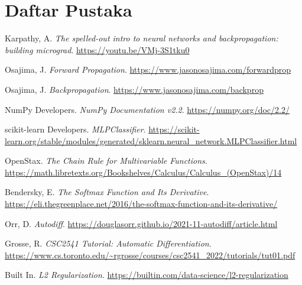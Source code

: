 
\chapter*{Daftar Pustaka}

\begin{enumerate}[label={[\arabic*]}]
    \item Karpathy, A. \textit{The spelled-out intro to neural networks and backpropagation: building micrograd}. \url{https://youtu.be/VMj-3S1tku0}

    \item Osajima, J. \textit{Forward Propagation}. \url{https://www.jasonosajima.com/forwardprop}

    \item Osajima, J. \textit{Backpropagation}. \url{https://www.jasonosajima.com/backprop}

    \item NumPy Developers. \textit{NumPy Documentation v2.2}. \url{https://numpy.org/doc/2.2/}

    \item scikit-learn Developers. \textit{MLPClassifier}. \url{https://scikit-learn.org/stable/modules/generated/sklearn.neural_network.MLPClassifier.html}

    \item OpenStax. \textit{The Chain Rule for Multivariable Functions}. \url{https://math.libretexts.org/Bookshelves/Calculus/Calculus_(OpenStax)/14}

    \item Bendersky, E. \textit{The Softmax Function and Its Derivative}. \url{https://eli.thegreenplace.net/2016/the-softmax-function-and-its-derivative/}

    \item Orr, D. \textit{Autodiff}. \url{https://douglasorr.github.io/2021-11-autodiff/article.html}

    \item Grosse, R. \textit{CSC2541 Tutorial: Automatic Differentiation}. \url{https://www.cs.toronto.edu/~rgrosse/courses/csc2541_2022/tutorials/tut01.pdf}

    \item Built In. \textit{L2 Regularization}. \url{https://builtin.com/data-science/l2-regularization}
\end{enumerate}
